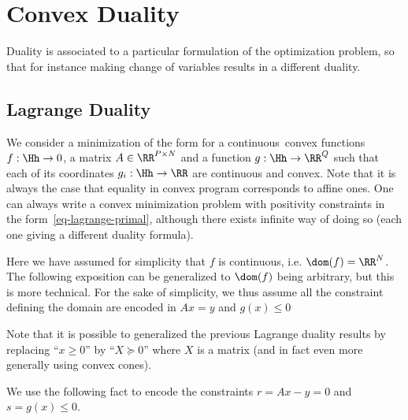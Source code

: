 \section{Convex Duality}
\label{sec-cvx-duality}

Duality is associated to a particular formulation of the optimization problem, so that for instance making change of variables results in a different duality. 

\subsection{Lagrange Duality}

We consider a minimization of the form
for a continuous convex functions $f : \Hh \rightarrow 0$, a matrix $A \in \RR^{P \times N}$ and a function $g : \Hh \rightarrow \RR^Q$ such that each of its coordinates $g_i : \Hh \rightarrow \RR$ are continuous and convex.  
%
Note that it is always the case that equality in convex program corresponds to affine ones. 
%
One can always write a convex minimization problem with positivity constraints in the form~\eqref{eq-lagrange-primal}, although there exists infinite way of doing so (each one giving a different duality formula). 

Here we have assumed for simplicity that $f$ is continuous, i.e. $\dom(f)=\RR^N$.
%
The following exposition can be generalized to $\dom(f)$ being arbitrary, but this is more technical. For the sake of simplicity, we thus assume all the constraint defining the domain are encoded in $Ax=y$ and $g(x) \leq 0$


Note that it is possible to generalized the previous Lagrange duality results by replacing ``$x \geq 0$'' by ``$X \succeq 0$'' where $X$ is a matrix (and in fact even more generally using convex cones). 

We use the following fact
to encode the constraints $r=Ax-y=0$ and $s=g(x) \leq 0$.

